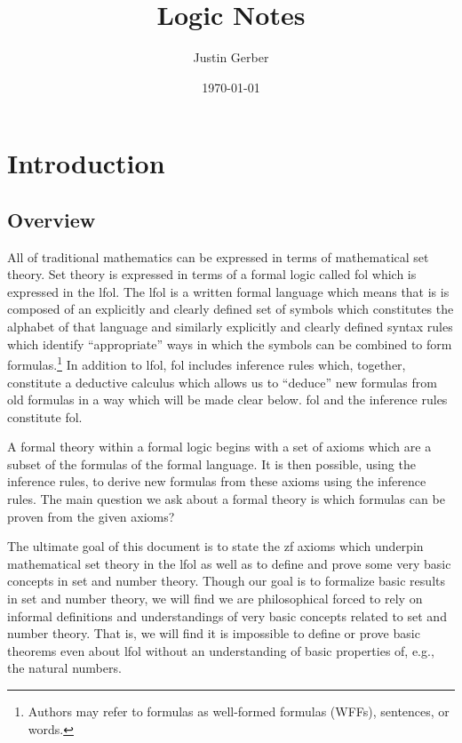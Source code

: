 \documentclass[12pt]{article}
\theoremstyle{break}
\theoremstyle{break}
\theoremstyle{break}
\theoremstyle{break}
\theoremstyle{break}
\newtheorem{informal definition}[definition]{Informal Definition}
\theoremstyle{break}
\newtheorem{informal theorem}[theorem]{Informal Theorem}
\newcommand{\qq}[1]{``#1''}
\begin{document}
\title{Logic Notes}
\author{Justin Gerber}
\date{\today}
\maketitle


\section{Introduction}


\subsection{Overview}

All of traditional mathematics can be expressed in terms of mathematical set theory.
Set theory is expressed in terms of a formal logic called \gls{fol} which is expressed in the \gls{lfol}.
The \gls{lfol} is a written formal language which means that is is composed of an explicitly and clearly defined set of symbols which constitutes the alphabet of that language and similarly explicitly and clearly defined syntax rules which identify \qq{appropriate} ways in which the symbols can be combined to form formulas.\footnote{Authors may refer to formulas as well-formed formulas (WFFs), sentences, or words.}
In addition to \gls{lfol}, \gls{fol} includes inference rules which, together, constitute a deductive calculus which allows us to \qq{deduce} new formulas from old formulas in a way which will be made clear below.
\gls{fol} and the inference rules constitute \gls{fol}.

A formal theory within a formal logic begins with a set of axioms which are a subset of the formulas of the formal language.
It is then possible, using the inference rules, to derive new formulas from these axioms using the inference rules.
The main question we ask about a formal theory is which formulas can be proven from the given axioms?

The ultimate goal of this document is to state the \gls{zf} axioms which underpin mathematical set theory in the \gls{lfol} as well as to define and prove some very basic concepts in set and number theory.
Though our goal is to formalize basic results in set and number theory, we will find we are philosophical forced to rely on informal definitions and understandings of very basic concepts related to set and number theory.
That is, we will find it is impossible to define or prove basic theorems even about \gls{lfol} without an understanding of basic properties of, e.g., the natural numbers.
\end{document}
